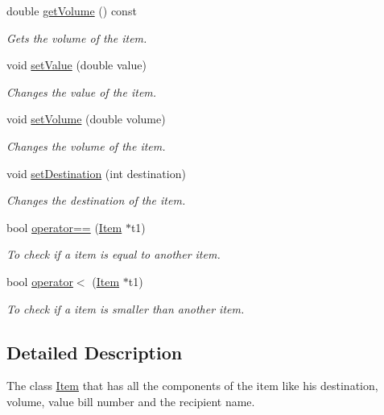 \begin{DoxyCompactItemize}
double \hyperlink{class_item_a2012dd0ae00de321806cae8416bdc37f}{get\+Volume} () const 
\begin{DoxyCompactList}\small\item\em Gets the volume of the item. \end{DoxyCompactList}\item 
void \hyperlink{class_item_ae3a3b615d2ebe2c04821243a63c77b22}{set\+Value} (double value)
\begin{DoxyCompactList}\small\item\em Changes the value of the item. \end{DoxyCompactList}\item 
void \hyperlink{class_item_a9f164194fd32c5de2ce0623d0740ea66}{set\+Volume} (double volume)
\begin{DoxyCompactList}\small\item\em Changes the volume of the item. \end{DoxyCompactList}\item 
void \hyperlink{class_item_a9556d4bf2df33d1942dc633c2ab21cff}{set\+Destination} (int destination)
\begin{DoxyCompactList}\small\item\em Changes the destination of the item. \end{DoxyCompactList}\item 
bool \hyperlink{class_item_a76fd3eaebd2156838d4d592bb39e091d}{operator==} (\hyperlink{class_item}{Item} $\ast$t1)
\begin{DoxyCompactList}\small\item\em To check if a item is equal to another item. \end{DoxyCompactList}\item 
bool \hyperlink{class_item_a2666e8308cf52f4737e38bb3c7ab113f}{operator$<$} (\hyperlink{class_item}{Item} $\ast$t1)
\begin{DoxyCompactList}\small\item\em To check if a item is smaller than another item. \end{DoxyCompactList}\end{DoxyCompactItemize}


\subsection{Detailed Description}
The class \hyperlink{class_item}{Item} that has all the components of the item like his destination, volume, value bill number and the recipient name. 

